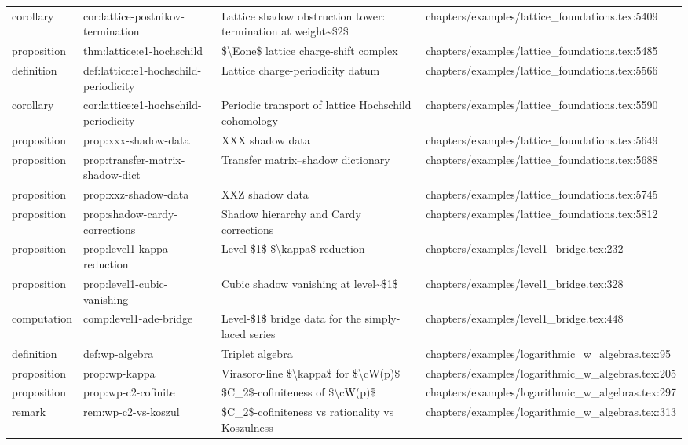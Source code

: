 \documentclass[11pt]{article}
\begin{document}
\begin{longtable}{L{0.10\textwidth}L{0.26\textwidth}L{0.42\textwidth}L{0.22\textwidth}}
corollary & cor:lattice-postnikov-termination & Lattice shadow obstruction tower: termination at weight\textasciitilde{}\$2\$ & chapters/examples/lattice\_foundations.tex:5409\\
proposition & thm:lattice:e1-hochschild & \$\textbackslash{}Eone\$ lattice charge-shift complex & chapters/examples/lattice\_foundations.tex:5485\\
definition & def:lattice:e1-hochschild-periodicity & Lattice charge-periodicity datum & chapters/examples/lattice\_foundations.tex:5566\\
corollary & cor:lattice:e1-hochschild-periodicity & Periodic transport of lattice Hochschild cohomology & chapters/examples/lattice\_foundations.tex:5590\\
proposition & prop:xxx-shadow-data & XXX shadow data & chapters/examples/lattice\_foundations.tex:5649\\
proposition & prop:transfer-matrix-shadow-dict & Transfer matrix--shadow dictionary & chapters/examples/lattice\_foundations.tex:5688\\
proposition & prop:xxz-shadow-data & XXZ shadow data & chapters/examples/lattice\_foundations.tex:5745\\
proposition & prop:shadow-cardy-corrections & Shadow hierarchy and Cardy corrections & chapters/examples/lattice\_foundations.tex:5812\\
proposition & prop:level1-kappa-reduction & Level-\$1\$ \$\textbackslash{}kappa\$ reduction & chapters/examples/level1\_bridge.tex:232\\
proposition & prop:level1-cubic-vanishing & Cubic shadow vanishing at level\textasciitilde{}\$1\$ & chapters/examples/level1\_bridge.tex:328\\
computation & comp:level1-ade-bridge & Level-\$1\$ bridge data for the simply-laced series & chapters/examples/level1\_bridge.tex:448\\
definition & def:wp-algebra & Triplet algebra & chapters/examples/logarithmic\_w\_algebras.tex:95\\
proposition & prop:wp-kappa & Virasoro-line \$\textbackslash{}kappa\$ for \$\textbackslash{}cW(p)\$ & chapters/examples/logarithmic\_w\_algebras.tex:205\\
proposition & prop:wp-c2-cofinite & \$C\_2\$-cofiniteness of \$\textbackslash{}cW(p)\$ & chapters/examples/logarithmic\_w\_algebras.tex:297\\
remark & rem:wp-c2-vs-koszul & \$C\_2\$-cofiniteness vs rationality vs Koszulness & chapters/examples/logarithmic\_w\_algebras.tex:313\\

\end{longtable}
\end{document}
